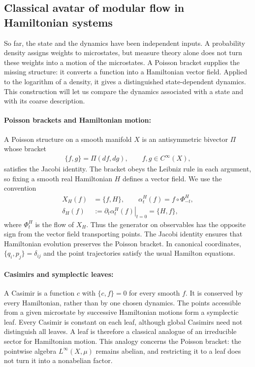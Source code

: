 \documentclass[a4paper,11pt]{article}
\theoremstyle{definition}
\newcommand{\nn}{\nonumber}
\begin{document}
\subsection{Classical avatar of modular flow in Hamiltonian systems}
\label{subsec:classical-state-flow}

So far, the state and the dynamics have been independent inputs. A probability density assigns weights to microstates, but measure theory alone does not turn these weights into a motion of the microstates. A Poisson bracket supplies the missing structure: it converts a function into a Hamiltonian vector field. Applied to the logarithm of a density, it gives a distinguished state-dependent dynamics. This construction will let us compare the dynamics associated with a state and with its coarse description.

\paragraph{Poisson brackets and Hamiltonian motion:}
A Poisson structure on a smooth manifold $X$ is an antisymmetric bivector $\Pi$ whose bracket
\begin{align}
    \{f,g\}=\Pi(df,dg),\qquad f,g\in C^\infty(X),
\end{align}
satisfies the Jacobi identity. The bracket obeys the Leibniz rule in each argument, so fixing a smooth real Hamiltonian $H$ defines a vector field. We use the convention
\begin{align}\label{eq:classical-Hamiltonian-convention}
    X_H(f)&=\{f,H\},\qquad
    \alpha_t^H(f)=f\circ\Phi_{-t}^H,\nn\\
    \delta_H(f)&:=\left.\partial_t\alpha_t^H(f)\right|_{t=0}=\{H,f\},
\end{align}
where $\Phi_t^H$ is the flow of $X_H$. Thus the generator on observables has the opposite sign from the vector field transporting points. The Jacobi identity ensures that Hamiltonian evolution preserves the Poisson bracket. In canonical coordinates, $\{q_i,p_j\}=\delta_{ij}$ and the point trajectories satisfy the usual Hamilton equations.

\paragraph{Casimirs and symplectic leaves:}
A Casimir is a function $c$ with $\{c,f\}=0$ for every smooth $f$. It is conserved by every Hamiltonian, rather than by one chosen dynamics. The points accessible from a given microstate by successive Hamiltonian motions form a symplectic leaf. Every Casimir is constant on each leaf, although global Casimirs need not distinguish all leaves. A leaf is therefore a classical analogue of an irreducible sector for Hamiltonian motion. This analogy concerns the Poisson bracket: the pointwise algebra $L^\infty(X,\mu)$ remains abelian, and restricting it to a leaf does not turn it into a nonabelian factor.
\end{document}
